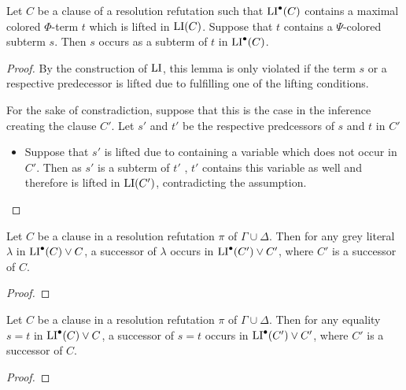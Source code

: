 \documentclass[,%
	draft=false,%
	numbers=noendperiod
	12pt,
	a4paper,
	oneside,%
	openany,
]{memoir}
\begin{document}
\begin{clemma}
	\label{lemma:pi_li_3}
	Let $C$ be a clause of a resolution refutation such that $\operatorname{LI}^\bullet(C)$ contains a maximal colored $\Phi$-term $t$ which is lifted in $\operatorname{LI}(C)$. 
	Suppose that $t$ contains a $\Psi$-colored subterm $s$.
	Then $s$ occurs as a subterm of $t$ in $\operatorname{LI}^\bullet(C)$.
\end{clemma}
\begin{proof}
	By the construction of $\operatorname{LI}$, this lemma is only violated if the term $s$ or a respective predecessor is lifted due to fulfilling one of the lifting conditions.

	For the sake of constradiction, suppose that this is the case in the inference creating the clause $C'$. Let $s'$ and $t'$ be the respective predcessors of $s$ and $t$ in $C'$

	\begin{itemize}
			\item 
				Suppose that $s'$ is lifted due to containing a variable which does not occur in $C'$.
				Then as $s'$ is a subterm of $t'$ , $t'$ contains this variable as well and therefore is lifted in $\operatorname{LI}(C')$, contradicting the assumption. 

			\qedhere
	\end{itemize}

\end{proof}

\begin{clemma}
	\label{lemma:grey_lits_all_in_LI}
	Let $C$ be a clause in a resolution refutation $\pi$ of $\Gamma \cup \Delta$.
	Then for any grey literal $\lambda$ in $\operatorname{LI}^\bullet(C) \lor C$, a successor of $\lambda$ occurs in $\operatorname{LI}^\bullet(C') \lor C'$, where $C'$ is a successor of $C$.
\end{clemma}
\begin{proof}
	\mytodo{}
\end{proof}

\begin{clemma}
	\label{lemma:equalities_all_in_LI}
	Let $C$ be a clause in a resolution refutation $\pi$ of $\Gamma \cup \Delta$.
	Then for any equality $s=t$ in $\operatorname{LI}^\bullet(C) \lor C$, a successor of $s=t$ occurs in $\operatorname{LI}^\bullet(C') \lor C'$, where $C'$ is a successor of $C$.
\end{clemma}
\begin{proof}
	\mytodo{}
\end{proof}
\end{document}
